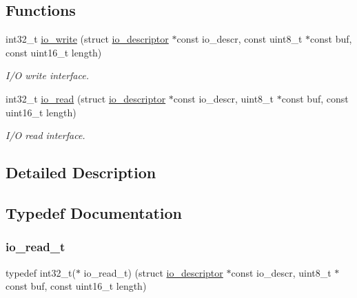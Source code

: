 \subsection*{Functions}
\begin{DoxyCompactItemize}
\item 
int32\+\_\+t \hyperlink{group__doc__driver__hal__helper__io_ga81aac60d5ce6feb0c44f8937d7c02f14}{io\+\_\+write} (struct \hyperlink{structio__descriptor}{io\+\_\+descriptor} $\ast$const io\+\_\+descr, const uint8\+\_\+t $\ast$const buf, const uint16\+\_\+t length)
\begin{DoxyCompactList}\small\item\em I/O write interface. \end{DoxyCompactList}\item 
int32\+\_\+t \hyperlink{group__doc__driver__hal__helper__io_gaf5e8722129933fa8e014144fd7505be6}{io\+\_\+read} (struct \hyperlink{structio__descriptor}{io\+\_\+descriptor} $\ast$const io\+\_\+descr, uint8\+\_\+t $\ast$const buf, const uint16\+\_\+t length)
\begin{DoxyCompactList}\small\item\em I/O read interface. \end{DoxyCompactList}\end{DoxyCompactItemize}


\subsection{Detailed Description}


\subsection{Typedef Documentation}
\mbox{\label{group__doc__driver__hal__helper__io_ga4d9ae58de2887289fe09eac6f0aa8be7}} 
\subsubsection{\texorpdfstring{io\+\_\+read\+\_\+t}{io\_read\_t}}
{\footnotesize\ttfamily typedef int32\+\_\+t($\ast$ io\+\_\+read\+\_\+t) (struct \hyperlink{structio__descriptor}{io\+\_\+descriptor} $\ast$const io\+\_\+descr, uint8\+\_\+t $\ast$const buf, const uint16\+\_\+t length)}



